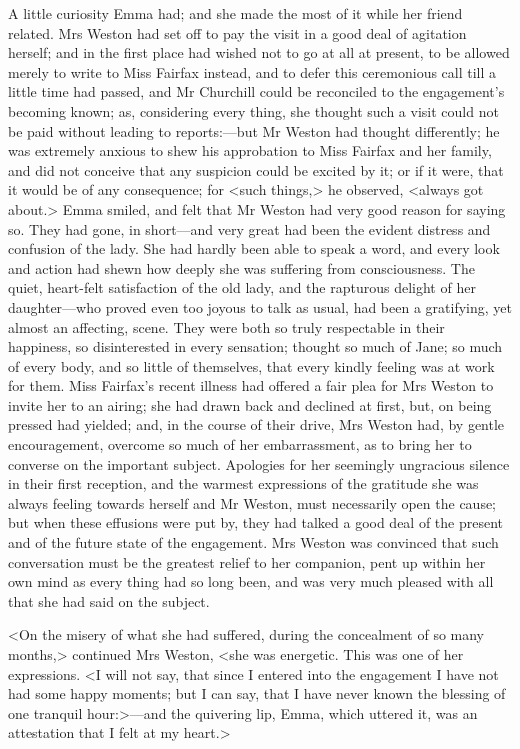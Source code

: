A little curiosity Emma had; and she made the most of it while her friend related. Mrs Weston had set off to pay the visit in a good deal of agitation herself; and in the first place had wished not to go at all at present, to be allowed merely to write to Miss Fairfax instead, and to defer this ceremonious call till a little time had passed, and Mr Churchill could be reconciled to the engagement's becoming known; as, considering every thing, she thought such a visit could not be paid without leading to reports:—but Mr Weston had thought differently; he was extremely anxious to shew his approbation to Miss Fairfax and her family, and did not conceive that any suspicion could be excited by it; or if it were, that it would be of any consequence; for <such things,> he observed, <always got about.> Emma smiled, and felt that Mr Weston had very good reason for saying so. They had gone, in short—and very great had been the evident distress and confusion of the lady. She had hardly been able to speak a word, and every look and action had shewn how deeply she was suffering from consciousness. The quiet, heart-felt satisfaction of the old lady, and the rapturous delight of her daughter—who proved even too joyous to talk as usual, had been a gratifying, yet almost an affecting, scene. They were both so truly respectable in their happiness, so disinterested in every sensation; thought so much of Jane; so much of every body, and so little of themselves, that every kindly feeling was at work for them. Miss Fairfax's recent illness had offered a fair plea for Mrs Weston to invite her to an airing; she had drawn back and declined at first, but, on being pressed had yielded; and, in the course of their drive, Mrs Weston had, by gentle encouragement, overcome so much of her embarrassment, as to bring her to converse on the important subject. Apologies for her seemingly ungracious silence in their first reception, and the warmest expressions of the gratitude she was always feeling towards herself and Mr Weston, must necessarily open the cause; but when these effusions were put by, they had talked a good deal of the present and of the future state of the engagement. Mrs Weston was convinced that such conversation must be the greatest relief to her companion, pent up within her own mind as every thing had so long been, and was very much pleased with all that she had said on the subject.

<On the misery of what she had suffered, during the concealment of so many months,> continued Mrs Weston, <she was energetic. This was one of her expressions. <I will not say, that since I entered into the engagement I have not had some happy moments; but I can say, that I have never known the blessing of one tranquil hour:>—and the quivering lip, Emma, which uttered it, was an attestation that I felt at my heart.>

